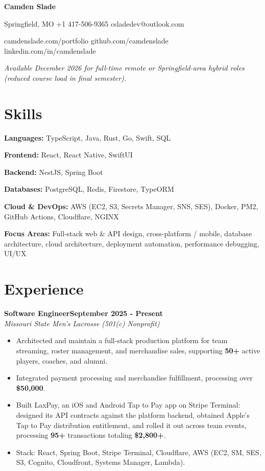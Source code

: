\documentclass[letterpaper,10pt]{article}
\newcommand{\skill}[2]{\textbf{#1:} #2\par\vspace{1.5pt}}
\newcommand{\position}[3]{%
  \vspace{4pt}%
  {\bfseries #1}\hfill{\bfseries #3}\\[0pt]
  \textit{#2}\par
}
\begin{document}
\begingroup
\centering
{\fontsize{26}{30}\selectfont\bfseries Camden Slade}\par
\vspace{4pt}
{\small
Springfield, MO \enspace\textbar\enspace +1 417-506-9365 \enspace\textbar\enspace csladedev@outlook.com\par
\vspace{2pt}
camdenslade.com/portfolio \enspace\textbar\enspace github.com/camdenslade \enspace\textbar\enspace linkedin.com/in/camdenslade\par
}
\vspace{4pt}
{\small\itshape Available December 2026 for full-time remote or Springfield-area hybrid roles (reduced course load in final semester).\par}
\endgroup
\vspace{2pt}

\section{Skills}
\skill{Languages}{TypeScript, Java, Rust, Go, Swift, SQL}
\skill{Frontend}{React, React Native, SwiftUI}
\skill{Backend}{NestJS, Spring Boot}
\skill{Databases}{PostgreSQL, Redis, Firestore, TypeORM}
\skill{Cloud \& DevOps}{AWS (EC2, S3, Secrets Manager, SNS, SES), Docker, PM2, GitHub Actions, Cloudflare, NGINX}
\skill{Focus Areas}{Full-stack web \& API design, cross-platform / mobile, database architecture, cloud architecture, deployment automation, performance debugging, UI/UX}

\section{Experience}

\position{Software Engineer}{Missouri State Men's Lacrosse (501(c) Nonprofit)}{September 2025 - Present}
\begin{itemize}
  \item Architected and maintain a full-stack production platform for team streaming, roster management, and merchandise sales, supporting \textbf{50+} active players, coaches, and alumni.
  \item Integrated payment processing and merchandise fulfillment, processing over \textbf{\$50,000}.
  \item Built LaxPay, an iOS and Android Tap to Pay app on Stripe Terminal: designed its API contracts against the platform backend, obtained Apple's Tap to Pay distribution entitlement, and rolled it out across team events, processing \textbf{95+} transactions totaling \textbf{\$2,800+}.
  \item Stack: React, Spring Boot, Stripe Terminal, Cloudflare, AWS (EC2, SM, SES, S3, Cognito, Cloudfront, Systems Manager, Lambda).
\end{itemize}
\end{document}
